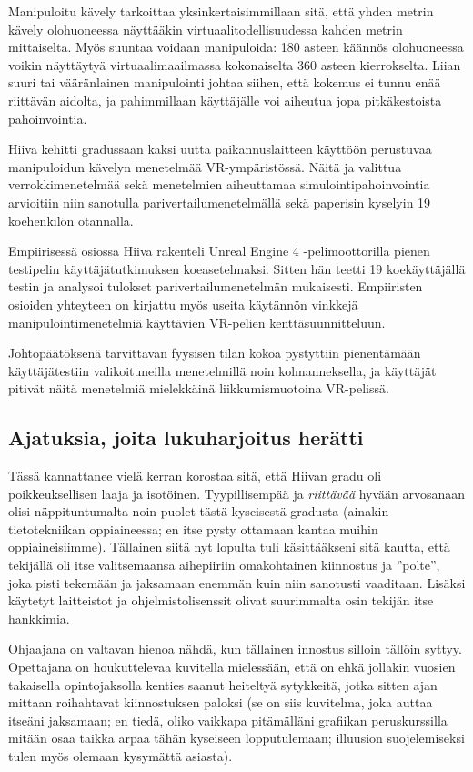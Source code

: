 \documentclass[utf8]{gradu3}
\begin{document}
Manipuloitu kävely tarkoittaa yksinkertaisimmillaan sitä, että yhden metrin
kävely olohuoneessa näyttääkin virtuaalitodellisuudessa kahden metrin
mittaiselta. Myös suuntaa voidaan manipuloida: 180 asteen käännös olohuoneessa
voikin näyttäytyä virtuaalimaailmassa kokonaiselta 360 asteen kierrokselta.
Liian suuri tai vääränlainen manipulointi johtaa siihen, että kokemus ei tunnu
enää riittävän aidolta, ja pahimmillaan käyttäjälle voi aiheutua jopa
pitkäkestoista pahoinvointia.

Hiiva kehitti gradussaan kaksi uutta paikannuslaitteen käyttöön perustuvaa
manipuloidun kävelyn menetelmää VR-ympäristössä. Näitä ja valittua
verrokkimenetelmää sekä menetelmien aiheuttamaa simulointipahoinvointia
arvioitiin niin sanotulla parivertailumenetelmällä sekä paperisin kyselyin 19
koehenkilön otannalla.

Empiirisessä osiossa Hiiva rakenteli Unreal Engine 4 -pelimoottorilla pienen
testipelin käyttäjätutkimuksen koeasetelmaksi. Sitten hän teetti 19
koekäyttäjällä testin ja analysoi tulokset parivertailumenetelmän mukaisesti.
Empiiristen osioiden yhteyteen on kirjattu myös useita käytännön vinkkejä
manipulointimenetelmiä käyttävien VR-pelien kenttäsuunnitteluun.

Johtopäätöksenä tarvittavan fyysisen tilan kokoa pystyttiin pienentämään
käyttäjätestiin valikoituneilla menetelmillä noin kolmanneksella, ja käyttäjät
pitivät näitä menetelmiä mielekkäinä liikkumismuotoina VR-pelissä.


\subsection{Ajatuksia, joita lukuharjoitus herätti}

Tässä kannattanee vielä kerran korostaa sitä, että Hiivan gradu oli
poikkeuksellisen laaja ja isotöinen. Tyypillisempää ja \emph{riittävää} hyvään
arvosanaan olisi näppituntumalta noin puolet tästä kyseisestä gradusta (ainakin
tietotekniikan oppiaineessa; en itse pysty ottamaan kantaa muihin
oppiaineisiimme). Tällainen siitä nyt lopulta tuli
%
käsittääkseni sitä kautta, että tekijällä oli itse valitsemaansa aihepiiriin
omakohtainen kiinnostus ja ''polte'', joka pisti tekemään ja jaksamaan enemmän
kuin niin sanotusti vaaditaan. Lisäksi käytetyt laitteistot ja
ohjelmistolisenssit olivat suurimmalta osin tekijän itse hankkimia.

Ohjaajana on valtavan hienoa nähdä, kun tällainen innostus silloin tällöin
syttyy. Opettajana on houkuttelevaa kuvitella mielessään, että on ehkä jollakin
vuosien takaisella opintojaksolla kenties saanut heiteltyä sytykkeitä, jotka
sitten ajan mittaan roihahtavat kiinnostuksen paloksi (se on siis kuvitelma,
joka auttaa itseäni jaksamaan; en tiedä, oliko vaikkapa pitämälläni grafiikan
peruskurssilla mitään osaa taikka arpaa tähän kyseiseen lopputulemaan; illuusion
suojelemiseksi tulen myös olemaan kysymättä asiasta).
\end{document}
